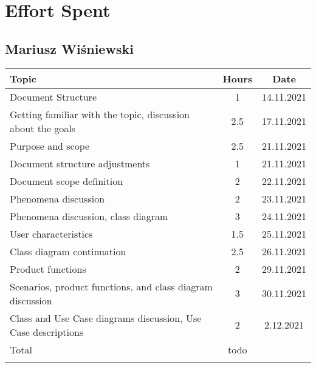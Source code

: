 \chapter{Effort Spent}

\section*{Mariusz Wiśniewski}
\begin{table}[H]
    \centering
    \begin{tabular}{lcc} \Xhline{1.5pt}
        Topic & Hours & Date\\ \hline
        Document Structure & 1 & 14.11.2021\\ 
        Getting familiar with the topic, discussion about the goals & 2.5 & 17.11.2021\\ 
        Purpose and scope & 2.5 & 21.11.2021\\ 
        Document structure adjustments & 1 & 21.11.2021\\
        Document scope definition & 2 & 22.11.2021\\
        Phenomena discussion & 2 & 23.11.2021\\
        Phenomena discussion, class diagram & 3 & 24.11.2021\\ 
        User characteristics & 1.5 & 25.11.2021\\ 
        Class diagram continuation & 2.5 & 26.11.2021 \\ 
        Product functions & 2 & 29.11.2021 \\
        Scenarios, product functions, and class diagram discussion & 3 & 30.11.2021\\
        Class and Use Case diagrams discussion, Use Case descriptions & 2 & 2.12.2021\\ \hline
        Total & todo &\\ \Xhline{1.5pt}
    \end{tabular}
\end{table}

